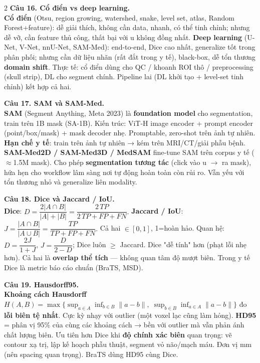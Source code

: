 \begin{paracol}{2}
\textbf{Câu 16. Cổ điển vs deep learning.}\\
\textbf{Cổ điển} (Otsu, region growing, watershed, snake, level set, atlas, Random Forest+feature): dễ giải thích, không cần data, nhanh, có thể tinh chỉnh; nhưng dễ vỡ, cần feature thủ công, thất bại với u không đồng nhất. \textbf{Deep learning} (U-Net, V-Net, nnU-Net, SAM-Med): end-to-end, Dice cao nhất, generalize tốt trong phân phối; nhưng cần dữ liệu nhãn (rất đắt trong y tế), black-box, dễ tổn thương \textbf{domain shift}. Thực tế: cổ điển dùng cho QC / khoanh ROI thô / preprocessing (skull strip), DL cho segment chính. Pipeline lai (DL khởi tạo + level-set tinh chỉnh) kết hợp cả hai.

\textbf{Câu 17. SAM và SAM-Med.}\\
\textbf{SAM} (Segment Anything, Meta 2023) là \textbf{foundation model} cho segmentation, train trên 1B mask (SA-1B). Kiến trúc: ViT-H image encoder + prompt encoder (point/box/mask) + mask decoder nhẹ. Promptable, zero-shot trên ảnh tự nhiên. \textbf{Hạn chế y tế}: train trên ảnh tự nhiên → kém trên MRI/CT/giải phẫu bệnh. \textbf{SAM-Med2D / SAM-Med3D / MedSAM} fine-tune SAM trên corpus y tế (\(\approx\)1.5M mask). Cho phép \textbf{segmentation tương tác} (click vào u $\to$ ra mask), hứa hẹn cho workflow lâm sàng nơi tự động hoàn toàn còn rủi ro. Vẫn yếu với tổn thương nhỏ và generalize liên modality.

\textbf{Câu 18. Dice và Jaccard / IoU.}\\
\textbf{Dice}: $D=\dfrac{2|A\cap B|}{|A|+|B|}=\dfrac{2\,TP}{2\,TP+FP+FN}.$ \textbf{Jaccard / IoU}: $J=\dfrac{|A\cap B|}{|A\cup B|}=\dfrac{TP}{TP+FP+FN}.$ Cả hai $\in[0,1]$, 1=hoàn hảo. Quan hệ: $D=\dfrac{2J}{1+J}$, $J=\dfrac{D}{2-D}$; Dice luôn $\geq$ Jaccard. Dice "dễ tính" hơn (phạt lỗi nhẹ hơn). Cả hai là \textbf{overlap thể tích} — không quan tâm độ mượt biên. Trong y tế Dice là metric báo cáo chuẩn (BraTS, MSD).

\textbf{Câu 19. Hausdorff95.}\\
\textbf{Khoảng cách Hausdorff} $H(A,B)=\max\{\sup_{a\in A}\inf_{b\in B}\|a-b\|,\;\sup_{b\in B}\inf_{a\in A}\|a-b\|\}$ đo \textbf{lỗi biên tệ nhất}. Cực kỳ nhạy với outlier (một voxel lạc cũng làm hỏng). \textbf{HD95} = phân vị 95\% của cùng các khoảng cách → bền với outlier mà vẫn phản ánh chất lượng biên. Ưu tiên hơn Dice khi \textbf{độ chính xác biên} quan trọng: vẽ contour xạ trị, lập kế hoạch phẫu thuật, segment vỏ não/mạch máu. Đơn vị mm (nên spacing quan trọng). BraTS dùng HD95 cùng Dice.


\end{paracol}
